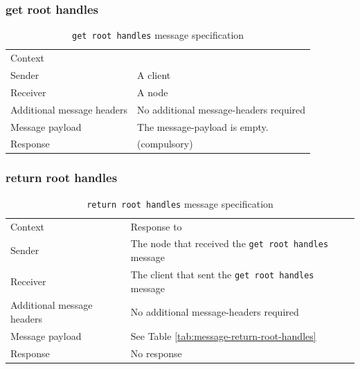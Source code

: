 \subsubsection{get root handles}\label{sec:get-root-handles}
\begin{table}[H]
    \begin{tabu}{lX}
        Context
        &  \\
        
        Sender
        & A \gls{client} \\
        
        Receiver
        & A \gls{node} \\
        
        Additional message headers
        &  No additional \glspl{message-header} required \\
        
        Message payload
        & The \gls{message-payload} is empty. \\

        Response
        &  (compulsory) \\
    \end{tabu}
    \caption{\texttt{get root handles} message specification}
\end{table}

\subsubsection{return root handles}\label{sec:return-root-handles}
\begin{table}[H]
    \begin{tabu}{lX}
        Context
        & Response to  \\
        
        Sender
        & The \gls{node} that received the \texttt{get root handles} message \\
        
        Receiver
        & The \gls{client} that sent the \texttt{get root handles} message \\
        
        Additional message headers
        &  No additional \glspl{message-header} required \\
        
        Message payload
        & See Table \ref{tab:message-return-root-handles}\\

        Response
        & No response \\
    \end{tabu}
    \caption{\texttt{return root handles} message specification}
\end{table}

